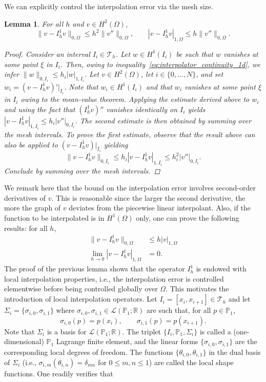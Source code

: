 \documentclass{article}
\newtheorem{lemma}{Lemma}
\begin{document}
We can explicitly control the interpolation error via the mesh size.
\begin{lemma}
    For all $h$ and $v \in H^2(\Omega)$,
    $$ \|v - I_h^1 v\|_{0,\Omega} \le h^2 \|v''\|_{0,\Omega},\qquad  |v - I_h^1 v|_{1,\Omega} \le h \|v''\|_{0,\Omega}. $$
\begin{proof}
    Consider an interval $I_i \in \mathcal{T}_h$. Let $w \in H^1(I_i)$ be such that $w$ vanishes at some point $\xi$ in $I_i$. Then, owing to inequality~\ref{eq:interpolator_continuity_1d}, we infer $\|w\|_{0,I_i} \le h_i |w|_{1,I_i}$.
    Let $v \in H^2(\Omega)$, let $i \in \{0, \dots, N\}$, and set $w_i = (v - I_h^1 v)'|_{I_i}$. Note that $w_i \in H^1(I_i)$ and that $w_i$ vanishes at some point $\xi$ in $I_i$ owing to the mean-value theorem. Applying the estimate derived above to $w_i$ and using the fact that $(I_h^1 v)''$ vanishes identically on $I_i$ yields $|v - I_h^1 v|_{1,I_i} \le h_i |v''|_{0,I_i}$. The second estimate is then obtained by summing over the mesh intervals. To prove the first estimate, observe that the result above can also be applied to $(v - I_h^1 v)|_{I_i}$ yielding
    $$ \|v - I_h^1 v\|_{0,I_i} \le h_i |v - I_h^1 v|_{1,I_i} \le h_i^2 |v''|_{0,I_i}. $$
    Conclude by summing over the mesh intervals.
\end{proof}
\end{lemma}
We remark here that the bound on the interpolation error involves second-order derivatives of $v$. This is reasonable since the larger the second derivative, the more the graph of $v$ deviates from the piecewise linear interpolant. Also, if the function to be interpolated is in $H^1(\Omega)$ only, one can prove the following results: for all $h$,
\begin{align*}
    \|v - I_h^1 v\|_{0,\Omega} &\le h |v|_{1,\Omega}\\
    \lim_{h \rightarrow 0} |v - I_h^1 v|_{1,\Omega} &= 0.
\end{align*}
The proof of the previous lemma shows that the operator $I_h^1$ is endowed with local interpolation properties, i.e., the interpolation error is controlled elementwise before being controlled globally over $\Omega$. This motivates the introduction of local interpolation operators. Let $I_i = [x_i, x_{i+1}] \in \mathcal{T}_h$ and let $\Sigma_i = \{\sigma_{i,0}, \sigma_{i,1}\}$ where $\sigma_{i,0}, \sigma_{i,1} \in \mathcal{L}(\mathbb{P}_1; \mathbb{R})$ are such that, for all $p \in \mathbb{P}_1$,
$$ \sigma_{i,0}(p) = p(x_i),\qquad \sigma_{i,1}(p) = p(x_{i+1}). $$
Note that $\Sigma_i$ is a basis for $\mathcal{L}(\mathbb{P}_1; \mathbb{R})$. The triplet $\{I_i, \mathbb{P}_1, \Sigma_i\}$ is called a (one-dimensional) $\mathbb{P}_1$ Lagrange finite element, and the linear forms $\{\sigma_{i,0}, \sigma_{i,1}\}$ are the corresponding local degrees of freedom. The functions $\{\theta_{i,0}, \theta_{i,1}\}$ in the dual basis of $\Sigma_i$ (i.e., $\sigma_{i,m}(\theta_{i,n}) = \delta_{mn}$ for $0 \le m, n \le 1$) are called the local shape functions. One readily verifies that
\end{document}

